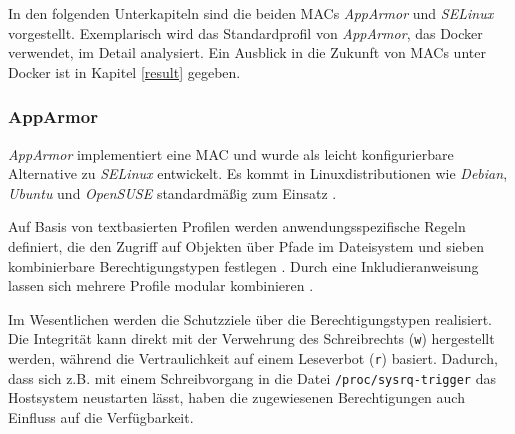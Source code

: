 \documentclass[../main.tex]{subfiles}
\begin{document}




			In den folgenden Unterkapiteln sind die beiden MACs \emph{AppArmor} und \emph{SELinux} vorgestellt. Exemplarisch wird das Standardprofil von \emph{AppArmor}, das Docker verwendet, im Detail analysiert. Ein Ausblick in die Zukunft von MACs unter Docker ist in Kapitel \ref{result} gegeben.

			\subsubsection{AppArmor}
				\emph{AppArmor} implementiert eine MAC und wurde als leicht konfigurierbare Alternative zu \emph{SELinux} entwickelt. Es kommt in Linuxdistributionen wie \emph{Debian}, \emph{Ubuntu} und \emph{OpenSUSE} standardmäßig zum Einsatz \cite{apparmorUbuntu}.

				Auf Basis von textbasierten Profilen werden anwendungsspezifische Regeln definiert, die den Zugriff auf Objekten über Pfade im Dateisystem und sieben kombinierbare Berechtigungstypen festlegen \cite{linuxSecOverview}\cite{apparmorQuickProfileLanguage}. Durch eine Inkludieranweisung lassen sich mehrere Profile modular kombinieren \cite{apparmorQuickProfileLanguage}.

				Im Wesentlichen werden die Schutzziele über die Berechtigungstypen realisiert. Die Integrität kann direkt mit der Verwehrung des Schreibrechts (\texttt{w}) hergestellt werden, während die Vertraulichkeit auf einem Leseverbot (\texttt{r}) basiert. Dadurch, dass sich z.B. mit einem Schreibvorgang in die Datei \texttt{/proc/sysrq-trigger} das Hostsystem neustarten lässt, haben die zugewiesenen Berechtigungen auch Einfluss auf die Verfügbarkeit.

\end{document}
